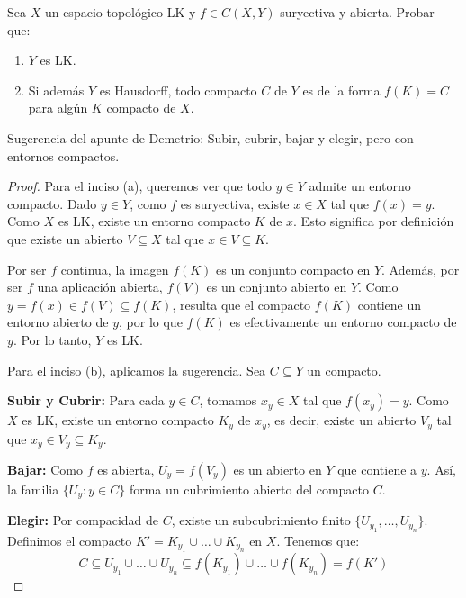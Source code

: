 \documentclass{article}
\theoremstyle{plain}
\theoremstyle{definition}
\newenvironment{ejercicio}[1]{\begin{trivlist}
\item[\hskip \labelsep {\bfseries Ejercicio}\hskip \labelsep {\bfseries #1.}]}{\end{trivlist}}
\begin{document}
\begin{ejercicio}{6}
    Sea \( X \) un espacio topológico LK y \( f \in C(X,Y) \) suryectiva y abierta. Probar que:
    \begin{enumerate}
        \item[(a)] \( Y \) es LK.
        \item[(b)] Si además \( Y \) es Hausdorff, todo compacto \( C \) de \( Y \) es de la forma \( f(K)=C \) para algún \( K \) compacto de \( X \).
    \end{enumerate}

    Sugerencia del apunte de Demetrio: Subir, cubrir, bajar y elegir, pero con entornos compactos.
\end{ejercicio}
\begin{proof}
    Para el inciso (a), queremos ver que todo \( y \in Y \) admite un entorno compacto.
    Dado \( y \in Y \), como \( f \) es suryectiva, existe \( x \in X \) tal que \( f(x) = y \).
    Como \( X \) es LK, existe un entorno compacto \( K \) de \( x \). Esto significa por definición que existe un abierto \( V \subseteq X \) tal que \( x \in V \subseteq K \).

    Por ser \( f \) continua, la imagen \( f(K) \) es un conjunto compacto en \( Y \). Además, por ser \( f \) una aplicación abierta, \( f(V) \) es un conjunto abierto en \( Y \).
    Como \( y = f(x) \in f(V) \subseteq f(K) \), resulta que el compacto \( f(K) \) contiene un entorno abierto de \( y \), por lo que \( f(K) \) es efectivamente un entorno compacto de \( y \). Por lo tanto, \( Y \) es LK.

    Para el inciso (b), aplicamos la sugerencia. Sea \( C \subseteq Y \) un compacto.

    \textbf{Subir y Cubrir:} Para cada \( y \in C \), tomamos \( x_y \in X \) tal que \( f(x_y) = y \). Como \( X \) es LK, existe un entorno compacto \( K_y \) de \( x_y \), es decir, existe un abierto \( V_y \) tal que \( x_y \in V_y \subseteq K_y \).

    \textbf{Bajar:} Como \( f \) es abierta, \( U_y = f(V_y) \) es un abierto en \( Y \) que contiene a \( y \). Así, la familia \( \{ U_y : y \in C \} \) forma un cubrimiento abierto del compacto \( C \).

    \textbf{Elegir:} Por compacidad de \( C \), existe un subcubrimiento finito \( \{ U_{y_1}, \dots, U_{y_n} \} \).
    Definimos el compacto \( K' = K_{y_1} \cup \dots \cup K_{y_n} \) en \( X \). Tenemos que:
    \[
        C \subseteq U_{y_1} \cup \dots \cup U_{y_n} \subseteq f(K_{y_1}) \cup \dots \cup f(K_{y_n}) = f(K')
    \]


\end{proof}
\end{document}
